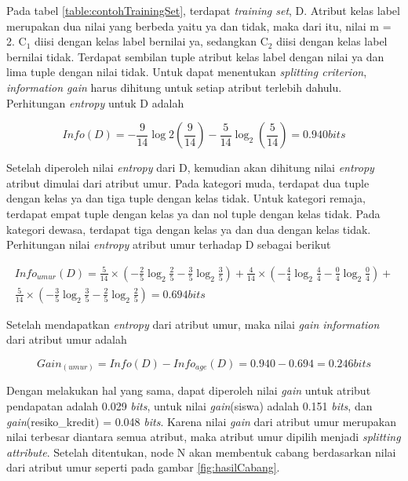 Pada tabel \ref{table:contohTrainingSet}, terdapat \textsl{training set}, D. Atribut kelas label merupakan dua nilai yang berbeda yaitu ya dan tidak, maka dari itu, nilai m = 2. C$_{1}$ diisi dengan kelas label bernilai ya, sedangkan C$_{2}$ diisi dengan kelas label bernilai tidak. Terdapat sembilan tuple atribut kelas label dengan nilai ya dan lima tuple dengan nilai tidak. Untuk dapat menentukan \textsl{splitting criterion}, \textsl{information gain} harus dihitung untuk setiap atribut terlebih dahulu. Perhitungan \textsl{entropy} untuk D adalah

\begin{displaymath}
	Info(D) = - \frac{9}{14}\log2(\frac{9}{14}) - \frac{5}{14}\log_2(\frac{5}{14}) = 0.940 bits
\end{displaymath}

Setelah diperoleh nilai \textsl{entropy} dari D, kemudian akan dihitung nilai \textsl{entropy} atribut dimulai dari atribut umur. Pada kategori muda, terdapat dua tuple dengan kelas ya dan tiga tuple dengan kelas tidak. Untuk kategori remaja, terdapat empat tuple dengan kelas ya dan nol tuple dengan kelas tidak. Pada kategori dewasa, terdapat tiga dengan kelas ya dan dua dengan kelas tidak. Perhitungan nilai \textsl{entropy} atribut umur terhadap D sebagai berikut

\begin{align*}
	Info_{umur}(D) = \frac{5}{14} \times (-\frac{2}{5}\log_2\frac{2}{5} - \frac{3}{5}\log_2\frac{3}{5}) + \frac{4}{14} \times (-\frac{4}{4}\log_2\frac{4}{4} - \frac{0}{4}\log_2\frac{0}{4}) + \\
	\frac{5}{14} \times (-\frac{3}{5}\log_2\frac{3}{5} - \frac{2}{5}\log_2\frac{2}{5}) = 0.694 bits
\end{align*}

Setelah mendapatkan \textsl{entropy} dari atribut umur, maka nilai \textsl{gain information} dari atribut umur adalah

\begin{displaymath}
	Gain_{(umur)} = Info(D) - Info_{age}(D) = 0.940 - 0.694 = 0.246 bits
\end{displaymath}

Dengan melakukan hal yang sama, dapat diperoleh nilai \textsl{gain} untuk atribut pendapatan adalah 0.029 \textsl{bits}, untuk nilai \textsl{gain}(siswa) adalah 0.151 \textsl{bits}, dan \textsl{gain}(resiko\_kredit) = 0.048 \textsl{bits}. Karena nilai \textsl{gain} dari atribut umur merupakan nilai terbesar diantara semua atribut, maka atribut umur dipilih menjadi \textsl{splitting attribute}. Setelah ditentukan, node N akan membentuk cabang berdasarkan nilai dari atribut umur seperti pada gambar \ref{fig:hasilCabang}.

